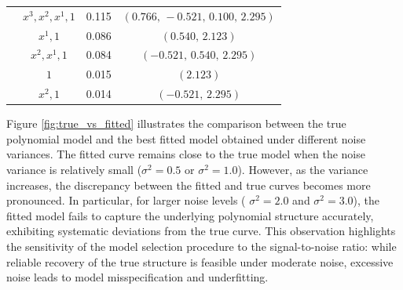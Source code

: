 \begin{table}
\begin{tabular}{cccc}
    & $x^3, x^2, x^1, 1$    & 0.115          & $(0.766,\,-0.521,\,0.100,\,2.295)$ \\
    & $x^1, 1$                & 0.086          & $(0.540,\,2.123)$ \\
    & $x^2, x^1, 1$          & 0.084          & $(-0.521,\,0.540,\,2.295)$ \\
    & $1$                      & 0.015          & $(2.123)$ \\
    & $x^2, 1$                & 0.014          & $(-0.521,\,2.295)$ \\
\bottomrule
\end{tabular}
\end{table}

Figure \ref{fig:true_vs_fitted} illustrates the comparison between the true polynomial model and the best fitted model obtained under different noise variances. The fitted curve remains close to the true model when the noise variance is relatively small ($\sigma^2 = 0.5$ or $\sigma^2 = 1.0$). However, as the variance increases, the discrepancy between the fitted and true curves becomes more pronounced. In particular, for larger noise levels ( $\sigma^2 = 2.0$ and $\sigma^2 = 3.0$), the fitted model fails to capture the underlying polynomial structure accurately, exhibiting systematic deviations from the true curve. This observation highlights the sensitivity of the model selection procedure to the signal-to-noise ratio: while reliable recovery of the true structure is feasible under moderate noise, excessive noise leads to model misspecification and underfitting.


